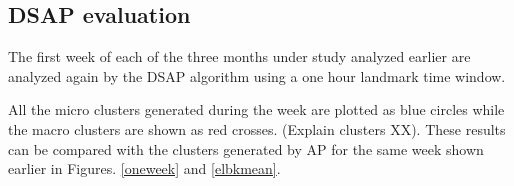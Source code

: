 \subsection{DSAP evaluation}


The first week of each of the three months under study analyzed earlier are analyzed again by the DSAP algorithm using a one hour landmark time window. 

All the micro clusters generated during the week are plotted as blue circles while the macro clusters are shown as red crosses. (Explain clusters XX). These results can be compared with the clusters generated by AP for the same week shown earlier in Figures. \ref{oneweek} and \ref{elbkmean}. 








